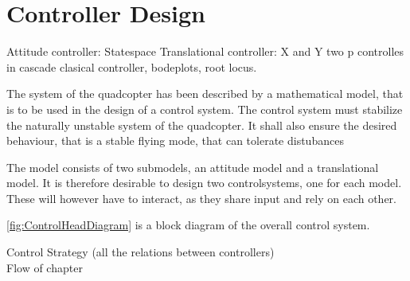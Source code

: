 \chapter{Controller Design}\label{chap:Control}
Attitude controller: Statespace 
Translational controller: X and Y two p controlles in cascade 
clasical controller, bodeplots, root locus. 


The system of the quadcopter has been described by a mathematical model, that is to be used in the design of a control system. The control system must stabilize the naturally unstable system of the quadcopter. It shall also ensure the desired behaviour, that is a stable flying mode, that can tolerate distubances 

The model consists of two submodels, an attitude model and a translational model. It is therefore desirable to design two controlsystems, one for each model. These will however have to interact, as they share input and rely on each other. 

\autoref{fig:ControlHeadDiagram} is a block diagram of the overall control system. 



Control Strategy (all the relations between controllers)\\



Flow of chapter\\